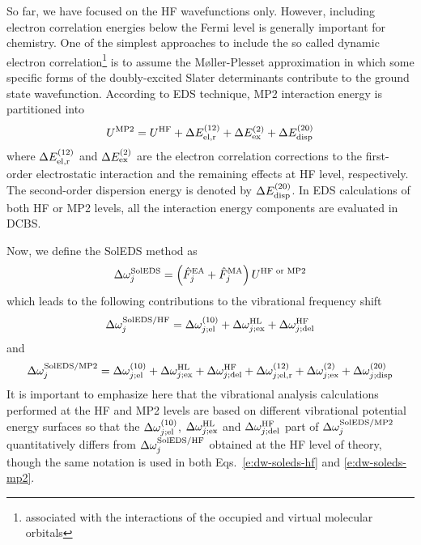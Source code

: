 \documentclass[a4paper,titlepage,twoside,fleqn,12pt]{book}
\begin{document}
\begin{refsection}
So far, we have focused on the HF wavefunctions only.\citep{Roothaan.RevModPhys.1951} 
However, including
electron correlation energies below the Fermi level is generally important
for chemistry. One of the simplest approaches to include the 
so called dynamic electron correlation\footnote{associated with
the interactions of the occupied and virtual molecular orbitals}
is to assume the 
M{\o}ller\hyp{}Plesset approximation\citep{Moller.Plesset.PhysRev.1934}
in which some specific forms of the doubly\hyp{}excited Slater
determinants contribute to the ground state wavefunction.
According to EDS technique, MP2 interaction energy is
partitioned into
%
\begin{equation}
 U^{\rm MP2} = U^{\rm HF}                    + 
               \Delta E_{\rm el,r}^{(12)}    + 
               \Delta E_{\rm ex}^{(2)}       +
               \Delta E_{\rm disp}^{(20)}  
\end{equation}
%
where $\Delta E_{\rm el,r}^{(12)}$ and $\Delta E_{\rm ex}^{(2)}$
are the electron correlation corrections to the first\hyp{}order
electrostatic interaction and the remaining effects at HF level,
respectively. The second\hyp{}order dispersion energy
is denoted by $\Delta E_{\rm disp}^{(20)}$. In EDS calculations
of both HF or MP2 levels,
all the interaction energy components are evaluated in DCBS.

Now, we define the SolEDS method as
%
\begin{equation} \label{e:dw-soleds}
 \Delta\omega_j^{\rm SolEDS} = \left(\hat{F}_j^{\rm EA} + \hat{F}_j^{\rm MA}\right)  U^{\rm HF\text{ or }MP2} 
\end{equation}
%
which leads to the following contributions to the vibrational
frequency shift
%
\begin{equation} \label{e:dw-soleds-hf}
 \Delta\omega_j^{\rm SolEDS/HF} = 
              \Delta \omega_{j;{\rm el}}^{(10)}    + 
              \Delta \omega_{j;{\rm ex}}^{\rm HL}  +
              \Delta \omega_{j;{\rm del}}^{\rm HF}
\end{equation}
%
and
%
\begin{equation} \label{e:dw-soleds-mp2}
 \Delta\omega_j^{\rm SolEDS/MP2} = 
              \Delta \omega_{j;{\rm el}}^{(10)}    + 
              \Delta \omega_{j;{\rm ex}}^{\rm HL}  +
              \Delta \omega_{j;{\rm del}}^{\rm HF} +
               \Delta \omega_{j;{\rm el,r}}^{(12)}    + 
               \Delta \omega_{j;{\rm ex}}^{(2)}       +
               \Delta \omega_{j;{\rm disp}}^{(20)}  
\end{equation}
%
It is important to emphasize here that the vibrational analysis 
calculations performed at the HF and MP2 levels are based on different
vibrational potential energy surfaces so that the $\Delta \omega_{j;{\rm el}}^{(10)}$,
$\Delta \omega_{j;{\rm ex}}^{\rm HL}$ and $\Delta \omega_{j;{\rm del}}^{\rm HF}$ 
part of $\Delta\omega_j^{\rm SolEDS/MP2}$ quantitatively differs from
$\Delta\omega_j^{\rm SolEDS/HF}$ obtained at the HF level of theory,
though the same notation is used in both Eqs.~\eqref{e:dw-soleds-hf} 
and \eqref{e:dw-soleds-mp2}.


\end{refsection}
\end{document}
